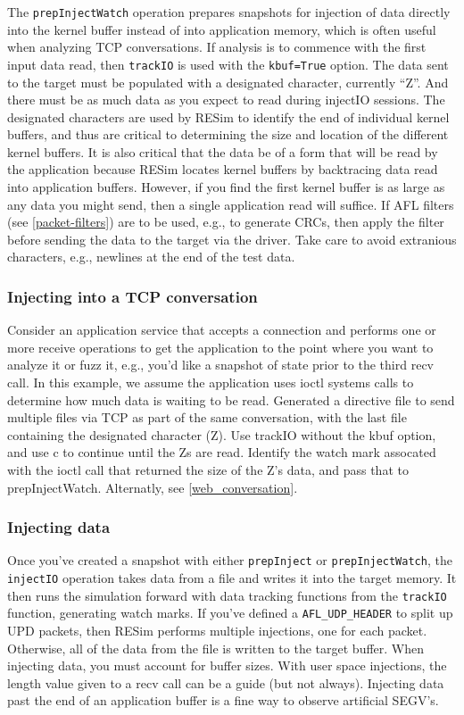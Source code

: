 \documentclass[titlepage]{article}
\begin{document}
The {\tt prepInjectWatch} operation prepares snapshots for injection of data directly into the kernel buffer instead of into application memory, which
is often useful when analyzing TCP conversations.
If analysis is to commence with the first input data read, then {\tt trackIO} is used with the {\tt kbuf=True} option.
The data sent to the target must be populated with 
a designated character, currently ``Z''.  And there must be as much data as you expect to read during injectIO sessions.  The designated characters are used by
RESim to identify the end of individual kernel buffers, and thus are critical to determining the size and location of the different kernel buffers.  It is also
critical that the data be of a form that will be read by the application because RESim locates kernel buffers by backtracing data read into application buffers.
However, if you find the first kernel buffer is as large as any data you might send, then a single application read will suffice.
If AFL filters (see \ref{packet-filters}) are to be used, e.g., to generate CRCs, then apply the filter before sending the data to the target via the driver.
Take care to avoid extranious characters, e.g., newlines at the end of the test data.

\subsubsection{Injecting into a TCP conversation}
Consider an application service that accepts a connection and performs one or more receive operations to get the application to the point where
you want to analyze it or fuzz it, e.g., you'd like a snapshot of state prior to the third recv call.  In this example, we assume the application 
uses ioctl systems calls to determine how much data is waiting to be read.  Generated a directive file to send multiple files via
TCP as part of the same conversation, with the last file containing the designated character (Z).  Use trackIO without the kbuf option, and
use c to continue until the Zs are read.  Identify the watch mark assocated with the ioctl call that returned the size of the Z's data,
and pass that to prepInjectWatch.  Alternatly, see \ref{web_conversation}.

\subsubsection{Injecting data}
\label{injecting-data}
Once you've created a snapshot with either {\tt prepInject} or {\tt prepInjectWatch}, the {\tt injectIO} operation takes data from a file and writes it into the 
target memory. It then runs the simulation forward with data tracking functions from the {\tt trackIO} function, generating watch marks.  
If you've defined a {\tt AFL\_UDP\_HEADER} to split up
UPD packets, then RESim performs multiple injections, one for each packet.  Otherwise, all of the data from the file is written to the target buffer.
When injecting data, you must account for buffer sizes.  With user space injections, the length value
given to a recv call can be a guide (but not always).  Injecting data past the end of an application buffer is a fine way to observe artificial SEGV's.
\end{document}

